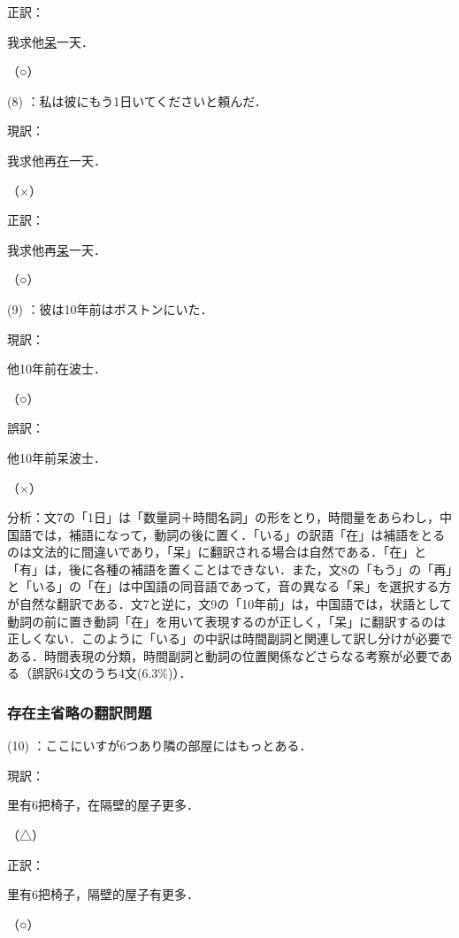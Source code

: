 \documentclass[japanese]{jnlp_1.4}
\begin{document}
正訳：\begin{簡体中文}我求他\ul{呆}一天．\end{簡体中文}（○）

(8) ：私は彼にもう1日いてくださいと頼んだ．

現訳：\begin{簡体中文}我求他再\ul{在}一天．\end{簡体中文}（×）

正訳：\begin{簡体中文}我求他再\ul{呆}一天．\end{簡体中文}（○）

(9) ：彼は10年前はボストンにいた．

現訳：\begin{簡体中文}他10年前在波士．\end{簡体中文}（○）

誤訳：\begin{簡体中文}他10年前呆波士．\end{簡体中文}（×）

分析：文7の「1日」は「数量詞＋時間名詞」の形をとり，時間量をあらわし，中国語では，補語になって，動詞の後に置く．「いる」の訳語「在」は補語をとるのは文法的に間違いであり，「呆」に翻訳される場合は自然である．「在」と「有」は，後に各種の補語を置くことはできない．また，文8の「もう」の「再」と「いる」の「在」は中国語の同音語であって，音の異なる「呆」を選択する方が自然な翻訳である．文7と逆に，文9の「10年前」は，中国語では，状語として動詞の前に置き動詞「在」を用いて表現するのが正しく，「呆」に翻訳するのは正しくない．このように「いる」の中訳は時間副詞と関連して訳し分けが必要である．時間表現の分類，時間副詞と動詞の位置関係などさらなる考察が必要である（誤訳64文のうち4文(6.3\%)）．



\subsubsection{存在主省略の翻訳問題}

(10) ：ここにいすが6つあり隣の部屋にはもっとある．

現訳：\begin{簡体中文}里有6把椅子，在隔壁的屋子更多．\end{簡体中文}（△）

正訳：\begin{簡体中文}里有6把椅子，隔壁的屋子有更多．\end{簡体中文}（○）
\end{document}
